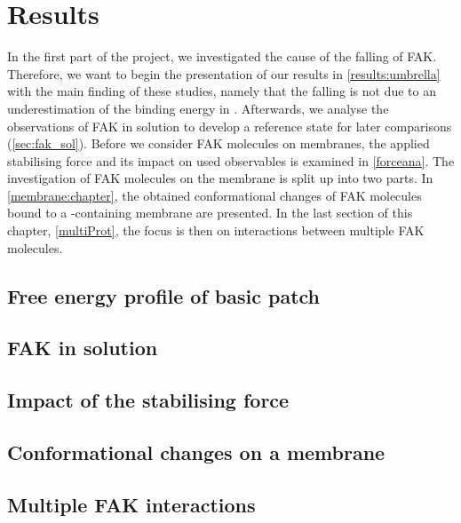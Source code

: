 \chapter{Results}
In the first part of the project, we investigated the cause of the falling of FAK. Therefore, we want to begin the presentation of our results in \autoref{results:umbrella} with the main finding of these studies, namely that the falling is not due to an underestimation of the binding energy in \martini{}. Afterwards, we analyse the observations of FAK in solution to develop a reference state for later comparisons (\autoref{sec:fak_sol}). Before we consider FAK molecules on membranes, the applied stabilising force and its impact on used observables is examined in \autoref{forceana}. The investigation of FAK molecules on the membrane is split up into two parts. In \autoref{membrane:chapter}, the obtained conformational changes of FAK molecules bound to a \pip{}-containing membrane are presented. In the last section of this chapter, \autoref{multiProt}, the focus is then on interactions between multiple FAK molecules.
%
%
\section{Free energy profile of basic patch}

\clearpage
%
%
\section{FAK in solution}

\clearpage
%
%
\section{Impact of the stabilising force}

\clearpage
%
%
\section{Conformational changes on a membrane}

\clearpage
%
%
\section{Multiple FAK interactions}

